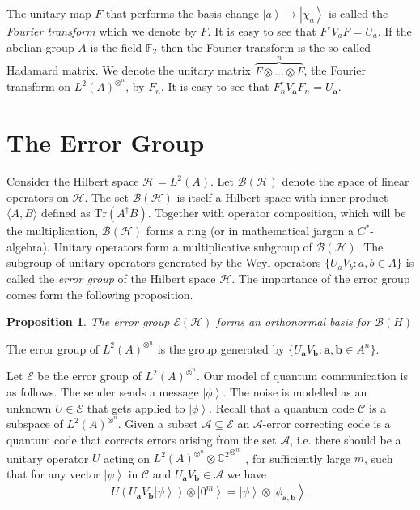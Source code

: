 \documentclass[11pt,twoside]{article}
\newtheorem{proposition}[theorem]{Proposition}
\theoremstyle{definition}
\theoremstyle{remark}
\newcommand{\ket}[1]{\ensuremath{\left\vert #1 \right\rangle}}
\newcommand{\LN}[1]{\ensuremath{L^2\left(#1\right)^{\otimes^n}}}
\newcommand{\Oper}[1]{\ensuremath{\mathcal{B}\left(#1\right)}}
\newcommand{\Qbit}[0]{{\ensuremath{\mathbb{C}^2}}}
\begin{document}
The unitary map $F$ that performs the basis change $\ket{a} \mapsto
\ket{\chi_a}$ is called the \emph{Fourier transform} which we denote
by $F$. It is easy to see that $F^\dag V_a F = U_a$. If the abelian
group $A$ is the field $\mathbb{F}_2$ then the Fourier transform is
the so called Hadamard matrix. We denote the unitary matrix
$\overbrace{F \otimes \ldots \otimes F}^n$, the Fourier transform on
$\LN{A}$, by $F_n$. It is easy to see that $ F_n^\dag V_{\mathbf{a}}
F_n = U_\mathbf{a}$.

\section{The Error Group}\label{sect:errorgroup}

Consider the Hilbert space $\mathcal{H} = L^2(A)$. Let
$\Oper{\mathcal{H}}$ denote the space of linear operators on
$\mathcal{H}$. The set $\Oper{\mathcal{H}}$ is itself a Hilbert space
with inner product $\langle A, B \rangle$ defined as
$\mathrm{Tr}(A^\dag B)$. Together with operator composition, which
will be the multiplication, $\Oper{\mathcal{H}}$ forms a ring (or in
mathematical jargon a $C^*$-algebra).  Unitary operators form a
multiplicative subgroup of $\Oper{\mathcal{H}}$. The subgroup of
unitary operators generated by the Weyl operators $\{ U_aV_b : a,b \in
A \}$ is called the \emph{error group} of the Hilbert space
$\mathcal{H}$.  The importance of the error group comes form the
following proposition.

\begin{proposition}
  The error group $\mathcal{E}(\mathcal{H})$ forms an orthonormal
  basis  for $\Oper{H}$
\end{proposition}
The error group of $\LN{A}$ is the group generated by $\{
U_{\mathbf{a}} V_{\mathbf{b}} : \mathbf{a}, \mathbf{b} \in A^n \}$.

Let $\mathcal{E}$ be the error group of $\LN{A}$. Our model of quantum
communication is as follows. The sender sends a message $\ket{\phi}$.
The noise is modelled as an unknown $U \in \mathcal{E}$ that gets
applied to $\ket{\phi}$. Recall that a quantum code $\mathcal{C}$ is a
subspace of $\LN{A}$.  Given a subset $\mathcal{A} \subseteq
\mathcal{E}$ an $\mathcal{A}$-error correcting code is a quantum code
that corrects errors arising from the set $\mathcal{A}$, i.e. there
should be a unitary operator $U$ acting on $\LN{A} \otimes
\Qbit^{\otimes^m}$ , for sufficiently large $m$, such that for any
vector $\ket{\psi}$ in $\mathcal{C}$ and $U_{\mathbf{a}}V_{\mathbf{b}}
\in \mathcal{A}$ we have
\[
U (U_{\mathbf{a}}V_{\mathbf{b}} \ket{\psi}) \otimes \ket{0^m} =
\ket{\psi} \otimes \ket{\phi_{\mathbf{a},\mathbf{b}}}.
\]
\end{document}
